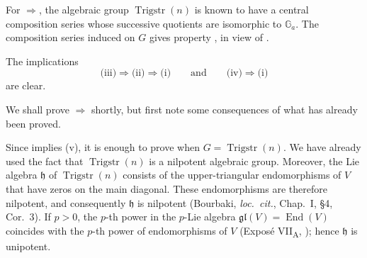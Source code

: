 For \(\Rightarrow\), the algebraic group
\(\operatorname{Trigstr}(n)\) is known to have a central composition
series whose successive quotients are isomorphic to \(\mathbb G_a\).
The composition series induced on \(G\) gives property , in view
of .

The implications
\[
  \text{(iii)}\Rightarrow\text{(ii)}\Rightarrow\text{(i)}
  \qquad\text{and}\qquad
  \text{(iv)}\Rightarrow\text{(i)}
\]
are clear.

We shall prove \(\Rightarrow\) shortly, but first note some
consequences of what has already been proved.





Since  implies (v), it is enough to prove  when
\(G=\operatorname{Trigstr}(n)\).  We have already used the fact that
\(\operatorname{Trigstr}(n)\) is a nilpotent algebraic group.
Moreover, the Lie algebra \(\mathfrak h\) of
\(\operatorname{Trigstr}(n)\) consists of the upper-triangular
endomorphisms of \(V\) that have zeros on the main diagonal.  These
endomorphisms are therefore nilpotent, and consequently
\(\mathfrak h\) is nilpotent (Bourbaki, \emph{loc.\ cit.},
Chap.~I, \S4, Cor.~3).  If \(p>0\), the \(p\)-th power in the
\(p\)-Lie algebra
\(\mathfrak{gl}(V)=\operatorname{End}(V)\) coincides with the
\(p\)-th power of endomorphisms of \(V\)
(Exposé VII\textsubscript{A}, ); hence \(\mathfrak h\) is
unipotent.

